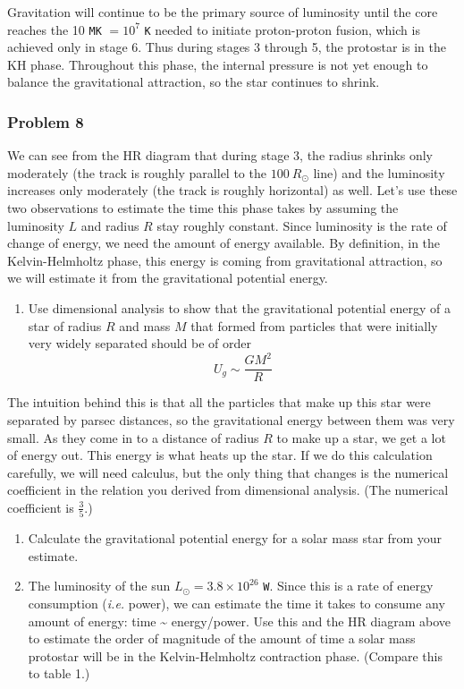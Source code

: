 \documentclass[11pt]{article}
\providecommand{\tightlist}{%
      \setlength{\itemsep}{0pt}\setlength{\parskip}{0pt}}
\begin{document}
Gravitation will continue to be the primary source of luminosity until
the core reaches the 10 \texttt{MK} \(= 10^7\) \texttt{K} needed to
initiate proton-proton fusion, which is achieved only in stage 6. Thus
during stages 3 through 5, the protostar is in the KH phase. Throughout
this phase, the internal pressure is not yet enough to balance the
gravitational attraction, so the star continues to shrink.

 
\subsubsection{Problem 8}\label{problem-8}

We can see from the HR diagram that during stage 3, the radius shrinks
only moderately (the track is roughly parallel to the \(100\ R_\odot\)
line) and the luminosity increases only moderately (the track is roughly
horizontal) as well. Let's use these two observations to estimate the
time this phase takes by assuming the luminosity \(L\) and radius \(R\)
stay roughly constant. Since luminosity is the rate of change of energy,
we need the amount of energy available. By definition, in the
Kelvin-Helmholtz phase, this energy is coming from gravitational
attraction, so we will estimate it from the gravitational potential
energy.

\begin{enumerate}
\def\labelenumi{\alph{enumi}.}
\tightlist
\item
  Use dimensional analysis to show that the gravitational potential
  energy of a star of radius \(R\) and mass \(M\) that formed from
  particles that were initially very widely separated should be of
  order\\
  \[
  U_g \sim \frac{GM^2}{R}\tag{7}
  \]
\end{enumerate}

The intuition behind this is that all the particles that make up this
star were separated by parsec distances, so the gravitational energy
between them was very small. As they come in to a distance of radius
\(R\) to make up a star, we get a lot of energy out. This energy is what
heats up the star. If we do this calculation carefully, we will need
calculus, but the only thing that changes is the numerical coefficient
in the relation you derived from dimensional analysis. (The numerical
coefficient is \(\frac35\).)

\begin{enumerate}
\def\labelenumi{\alph{enumi}.}
\setcounter{enumi}{1}
\item
  Calculate the gravitational potential energy for a solar mass star
  from your estimate.
\item
  The luminosity of the sun \(L_\odot=3.8\times 10^{26}\) \texttt{W}.
  Since this is a rate of energy consumption (\emph{i.e.} power), we can
  estimate the time it takes to consume any amount of energy: time
  \textasciitilde{} energy/power. Use this and the HR diagram above to
  estimate the order of magnitude of the amount of time a solar mass
  protostar will be in the Kelvin-Helmholtz contraction phase. (Compare
  this to table 1.)
\end{enumerate}
 
\end{document}
